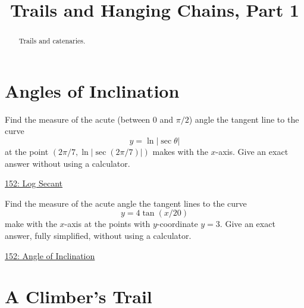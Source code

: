 \documentclass{ximera}
\title{Trails and Hanging Chains, Part 1}
\begin{document}
\begin{abstract}
Trails and catenaries.
\end{abstract}
\maketitle


\section{Angles of Inclination}

\begin{question}  \label{QPdiftgerdf}
Find the measure of the acute (between $0$ and $\pi/2$) angle the tangent line to the curve
\[
     y = \ln | \sec \theta|
\]
at the point $(2\pi/7, \ln |\sec (2\pi/7)|)$ makes with the $x$-axis. Give an exact answer without using a calculator.



\begin{onlineOnly}
    \begin{center}
\end{center}
\end{onlineOnly}

\href{https://www.desmos.com/calculator/yyyj3pjmk2}{152: Log Secant}
\end{question}


\begin{question}  \label{QJKDF3erdfsmdf}
Find the measure of the acute angle the tangent lines to the curve
\[
    y = 4 \tan(x/20)
\]
make with the $x$-axis at the points with $y$-coordinate $y=3$. Give an exact answer, fully simplified, without using a calculator.

\begin{onlineOnly}
    \begin{center}
\end{center}
\end{onlineOnly}

\href{https://www.desmos.com/calculator/df7hjgabzb}{152: Angle of Inclination}
\end{question}



\section{A Climber's Trail}
\end{document}
